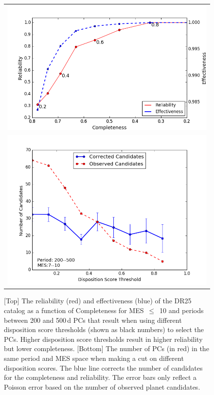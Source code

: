 \begin{figure}[htb]
 \begin{center}
 \begin{tabular}{c}
  \includegraphics[width=\linewidth]{fig-CRadjustScore-DR25.png} \\
  \includegraphics[width=\linewidth]{fig-varyScoreNcandidatesBox2.png}
  \end{tabular}
  \caption{\label{f:adjscore}[Top] The reliability (red) and effectiveness (blue) of the DR25 catalog as a function of Completeness for MES~$\leq$~10 and periods between 200 and 500\,d PCs that result when using different disposition score thresholds (shown as black numbers) to select the PCs. Higher disposition score thresholds result in higher reliability but lower completeness. [Bottom] The number of PCs (in red) in the same period and MES space when making a cut on different disposition scores.  The blue line corrects the number of candidates for the completeness and reliability. The error bars only reflect a Poisson error based on the number of observed planet candidates.}
 \end{center}
 \end{figure}


